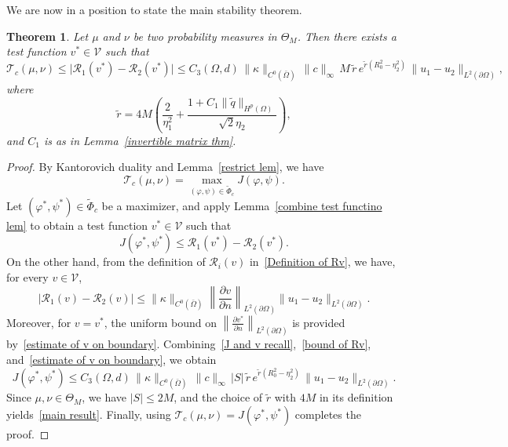 \documentclass[12pt]{amsart}
\newtheorem{thm}{Theorem}
\begin{document}
We are now in a position to state the main stability theorem.
\begin{thm}
Let $\mu$ and $\nu$ be two probability measures in $\Theta_M$. 
Then there exists a test function $v^*\in\mathcal{V}$ such that
\begin{equation}\label{main result}
    \mathcal{T}_c(\mu, \nu) 
    \leq \bigl|\mathcal{R}_1(v^*)-\mathcal{R}_2(v^*)\bigr|
    \leq C_3(\Omega,d)\,\|\kappa\|_{C^0(\bar{\Omega})}\,\|c\|_{\infty}\,
        M\,\tilde{r}\, e^{\tilde{r}(R_0^2 - \eta_2^2)}\,
        \|u_1 - u_2\|_{L^2(\partial \Omega)},
\end{equation}
where
\[
\tilde{r} = 4M \left( \frac{2}{\eta_1^2} 
      + \frac{1 + C_1 \|\tilde{q}\|_{H^p(\Omega)}}{\sqrt{2} \eta_2} \right),
\]
and \(C_1\) is as in Lemma~\ref{invertible matrix thm}.
\end{thm}

\begin{proof}
    By Kantorovich duality and Lemma~\ref{restrict lem}, we have
    \[
        \mathcal{T}_c(\mu, \nu) 
        = \max_{(\varphi, \psi) \in \widetilde{\Phi}_c} J(\varphi, \psi).
    \]
    Let \( (\varphi^*, \psi^*) \in \widetilde{\Phi}_c \) be a maximizer, and apply Lemma~\ref{combine test functino lem} to obtain a test function \( v^* \in \mathcal{V} \) such that
    \begin{equation}\label{J and v recall}
        J(\varphi^*, \psi^*) \leq \mathcal{R}_1(v^*) - \mathcal{R}_2(v^*).
    \end{equation}    
    On the other hand, from the definition of \( \mathcal{R}_i(v) \) in~\eqref{Definition of Rv}, we have, for every \(v\in\mathcal{V}\),
    \begin{equation}\label{bound of Rv}
        |\mathcal{R}_1(v) - \mathcal{R}_2(v)| 
        \leq \|\kappa\|_{C^0(\bar{\Omega})}
            \left\| \frac{\partial v}{\partial n} \right\|_{L^2(\partial \Omega)} 
            \|u_1 - u_2\|_{L^2(\partial \Omega)}.
    \end{equation}
    Moreover, for \(v=v^*\), the uniform bound on \( \left\| \frac{\partial v^*}{\partial n} \right\|_{L^2(\partial \Omega)} \) is provided by~\eqref{estimate of v on boundary}. 
    Combining~\eqref{J and v recall},~\eqref{bound of Rv}, and~\eqref{estimate of v on boundary}, we obtain
    \[
    J(\varphi^*, \psi^*) 
    \leq C_3(\Omega,d)\,\|\kappa\|_{C^0(\bar{\Omega})}\,\|c\|_{\infty}\,
            |S|\,\tilde{r}\, e^{\tilde{r}(R_0^2 - \eta_2^2)}\,
            \|u_1 - u_2\|_{L^2(\partial \Omega)}.
    \]
    Since \( \mu, \nu \in \Theta_M \), we have \( |S| \leq 2M \), and the choice of \(\tilde r\) with \(4M\) in its definition yields~\eqref{main result}. 
    Finally, using \(\mathcal{T}_c(\mu,\nu)=J(\varphi^*,\psi^*)\) completes the proof.
\end{proof}
\end{document}
